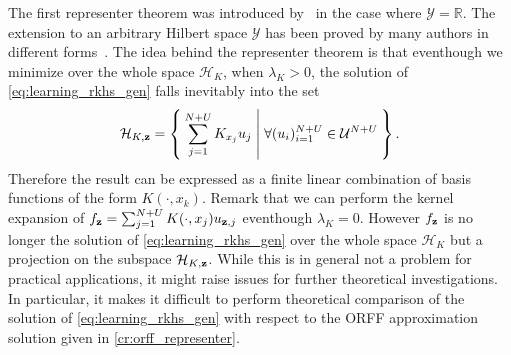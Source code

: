 The first representer theorem was introduced by~\citet{Wahba90} in the
case where $\mathcal{Y}=\mathbb{R}$. The extension to an arbitrary Hilbert
space $\mathcal{Y}$ has been proved by many authors in different
forms~\citep{Brouard2011,kadri2015operator,Micchelli2005}. The idea behind the
representer theorem is that eventhough we minimize over the whole space
$\mathcal{H}_K$, when $\lambda_K>0$, the solution of
\cref{eq:learning_rkhs_gen} falls inevitably into the set
\begin{dmath*}
    \mathcal{H}_{K, \seq{z}}=\Set{\sum_{j=1}^{N+U}K_{x_j}u_j| \forall
    (u_i)_{i=1}^{N+U} \in\mathcal{U}^{N+U}}.
\end{dmath*}
Therefore the result can be expressed as a finite linear combination of basis
functions of the form $K(\cdot,x_k)$. Remark that we can perform the kernel
expansion of $f_{\boldsymbol{\mathbf{z}}}=\sum_{j=1}^{N+U}K(\cdot,x_j)u_{\boldsymbol{\mathbf{z}},j}$ eventhough
$\lambda_K=0$. However $f_{\boldsymbol{\mathbf{z}}}$ is no longer the solution of
\cref{eq:learning_rkhs_gen} over the whole space $\mathcal{H}_K$ but a
projection on the subspace $\mathcal{H}_{K, \boldsymbol{\mathbf{z}}}$. While this is in general
not a problem for practical applications, it might raise issues for further
theoretical investigations. In particular, it makes it difficult to perform
theoretical comparison of the  solution of
\cref{eq:learning_rkhs_gen} with respect to the \acs{ORFF} approximation
solution given in \cref{cr:orff_representer}.
